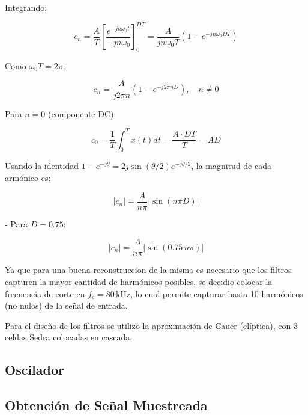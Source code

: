 Integrando:

\[
c_n = \frac{A}{T} \left[ \frac{e^{-j n \omega_0 t}}{-j n \omega_0} \right]_0^{D T}
= \frac{A}{j n \omega_0 T} \left( 1 - e^{-j n \omega_0 D T} \right)
\]

Como $\omega_0 T = 2 \pi$:

\[
c_n = \frac{A}{j 2 \pi n} \left( 1 - e^{-j 2 \pi n D} \right), \quad n \neq 0
\]

Para $n = 0$ (componente DC):

\[
c_0 = \frac{1}{T} \int_0^T x(t) dt = \frac{A \cdot D T}{T} = A D
\]



Usando la identidad $1 - e^{-j \theta} = 2 j \sin(\theta/2) e^{-j \theta/2}$, la magnitud de cada armónico es:

\[
|c_n| = \frac{A}{n \pi} \left| \sin(n \pi D) \right|
\]

- Para $D = 0.75$:

\[
|c_n| = \frac{A}{n \pi} \left| \sin(0.75 \, n \pi) \right|
\]

Ya que para una buena reconstruccion de la misma es necesario que los filtros
capturen la mayor cantidad de harmónicos posibles, se decidio colocar
la frecuencia de corte en $f_c = 80 \,\text{kHz}$, lo cual permite capturar 
hasta 10 harmónicos (no nulos) de la señal de entrada.

Para el diseño de los filtros se utilizo la aproximación de Cauer (elíptica), 
con 3 celdas Sedra colocadas en cascada.

\subsection{Oscilador}

\subsection{Obtención de Señal Muestreada}

